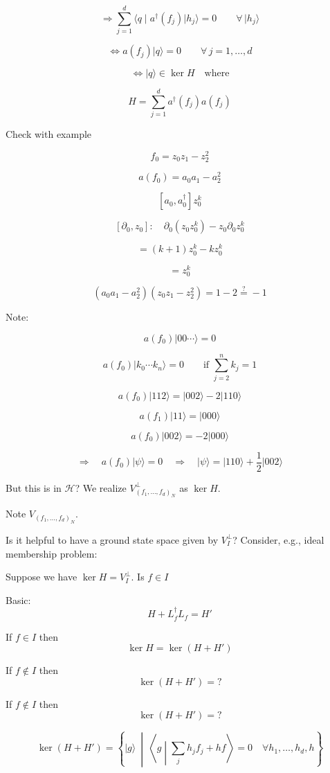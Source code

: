 \[
\Longrightarrow
\sum_{j=1}^{d}
\langle q\mid a^\dagger(f_j)\lvert h_j\rangle
=0
\qquad \forall\,\lvert h_j\rangle
\]

\[
\Longleftrightarrow
a(f_j)\lvert q\rangle=0
\qquad \forall\,j=1,\ldots,d
\]

\[
\Longleftrightarrow
\lvert q\rangle\in\ker H
\quad\text{where}
\]

\[
H=\sum_{j=1}^{d}a^\dagger(f_j)a(f_j)
\]

Check with example

\[
f_0=z_0z_1-z_2^2
\]

\[
a(f_0)=a_0a_1-a_2^2
\]

\[
[a_0,a_0^\dagger]z_0^k
\]

\[
[\partial_0,z_0]:
\quad
\partial_0(z_0z_0^k)-z_0\partial_0z_0^k
\]

\[
=(k+1)z_0^k-kz_0^k
\]

\[
=z_0^k
\]

\[
(a_0a_1-a_2^2)(z_0z_1-z_2^2)
=1-2\mathrel{\overset{?}{=}}-1
\]

Note:

\[
a(f_0)\lvert 00\cdots\rangle=0
\]

\[
a(f_0)\lvert k_0\cdots k_n\rangle=0
\qquad\text{if }\sum_{j=2}^n k_j=1
\]

\[
a(f_0)\lvert 112\rangle
=\lvert 002\rangle-2\lvert 110\rangle
\]

\[
a(f_1)\lvert 11\rangle=\lvert 000\rangle
\]

\[
a(f_0)\lvert 002\rangle=-2\lvert 000\rangle
\]

\[
\Longrightarrow\quad
a(f_0)\lvert\psi\rangle=0
\quad\Longrightarrow\quad
\lvert\psi\rangle=\lvert 110\rangle+\frac{1}{2}\lvert 002\rangle
\]

But this is in $\mathcal H$? We realize $V^\perp_{(f_1,\ldots,f_d)_N}$ as $\ker H$.

Note $V_{(f_1,\ldots,f_d)_N}$.

Is it helpful to have a ground state space given by $V_I^\perp$? Consider, e.g., ideal membership problem:

Suppose we have $\ker H=V_I^\perp$. Is $f\in I$

Basic:
\[
H+L_f^\dagger L_f=H'
\]

If $f\in I$ then
\[
\ker H=\ker(H+H')
\]

If $f\notin I$ then
\[
\ker(H+H')=?
\]

If $f\notin I$ then
\[
\ker(H+H')=? 
\]

\[
\ker(H+H')=
\left\{\lvert g\rangle\ \middle|\ 
\left\langle g\middle|\sum_j h_jf_j+hf\right\rangle=0
\quad\forall h_1,\ldots,h_d,h
\right\}
\]

